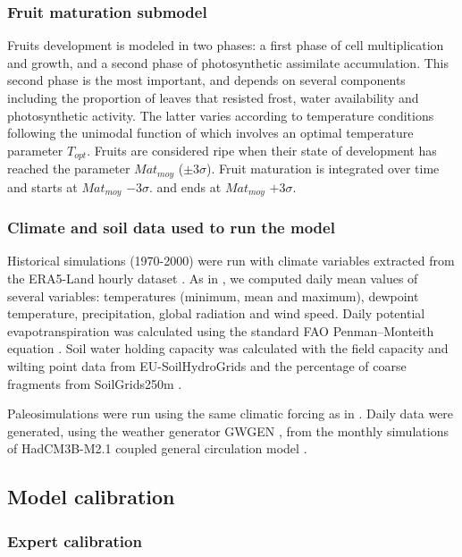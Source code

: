 \documentclass[letterpaper,8pt]{extarticle}  %
\begin{document}
\begin{doublespacing}
\begin{linenumbers}
\subsubsection{Fruit maturation submodel}

Fruits development is modeled in two phases:  a first phase of cell multiplication and growth, and a second phase of photosynthetic assimilate accumulation. This second phase is the most important, and depends on several components including the proportion of leaves that resisted frost, water availability and photosynthetic activity. The latter varies according to temperature conditions following the unimodal function of \citet{Wang1998} which involves an optimal temperature parameter $T_{opt}$. Fruits are considered ripe when their state of development has reached the parameter $Mat_{moy}$ ($\pm3\sigma$).  Fruit maturation is integrated over time and starts at $Mat_{moy}$ $-3\sigma$. and ends at $Mat_{moy}$ $+3\sigma$.

\subsubsection{Climate and soil data used to run the model}

Historical simulations (1970-2000) were run with climate variables extracted from the ERA5-Land hourly dataset \citep{MunozSabater2021}. As in \citet{VanderMeersch2023}, we computed daily mean values of several variables: temperatures (minimum, mean and maximum), dewpoint temperature, precipitation, global radiation and wind speed. Daily potential evapotranspiration was calculated using the standard FAO Penman–Monteith equation \citep{Allen1998}. Soil water holding capacity was calculated with the field capacity and wilting point data from EU-SoilHydroGrids \citep{Toth2017} and the percentage of coarse fragments from SoilGrids250m \citep{Hengl2017}.

Paleosimulations were run using the same climatic forcing as in \citet{VanderMeersch2024}. Daily data were generated, using the weather generator GWGEN \citep{Sommer2017}, from the monthly simulations of HadCM3B-M2.1 coupled general circulation model \citep{Armstrong2019}.

\subsection{Model calibration}

\subsubsection{Expert calibration}


\end{linenumbers}
\end{doublespacing}
\end{document}

